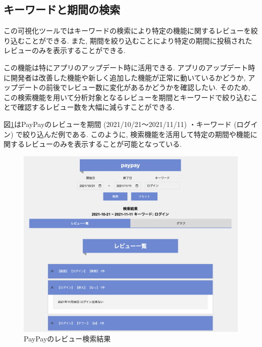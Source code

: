 \subsection{キーワードと期間の検索}
この可視化ツールではキーワードの検索により特定の機能に関するレビューを絞り込むことができる. また, 期間を絞り込むことにより特定の期間に投稿されたレビューのみを表示することができる.  

この機能は特にアプリのアップデート時に活用できる. アプリのアップデート時に開発者は改善した機能や新しく追加した機能が正常に動いているかどうか, アップデートの前後でレビュー数に変化があるかどうかを確認したい. そのため, この検索機能を用いて分析対象となるレビューを期間とキーワードで絞り込むことで確認するレビュー数を大幅に減らすことができる. 

図\ref{fig:paypay_search}はPayPayのレビューを期間 (2021/10/21〜2021/11/11) ・キーワード (ログイン) で絞り込んだ例である. このように, 検索機能を活用して特定の期間や機能に関するレビューのみを表示することが可能となっている. 
\begin{figure}[H]
  \centering
  \includegraphics[scale=0.3]
    {contents/images/paypay_search.png}
  \caption{PayPayのレビュー検索結果\label{fig:paypay_search}}
\end{figure}


